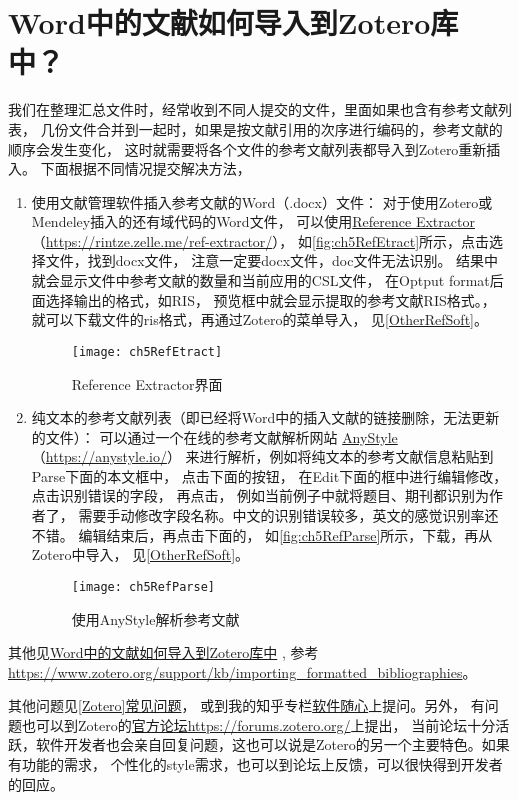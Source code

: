 \documentclass[cn,11pt,chinese]{elegantbook}
\begin{document}
	\section{Word中的文献如何导入到Zotero库中？}\label{sec:RefExtract}	
			我们在整理汇总文件时，经常收到不同人提交的文件，里面如果也含有参考文献列表，
			几份文件合并到一起时，如果是按文献引用的次序进行编码的，参考文献的顺序会发生变化，
			这时就需要将各个文件的参考文献列表都导入到Zotero重新插入。
			下面根据不同情况提交解决方法，
			\begin{enumerate}
				\item 使用文献管理软件插入参考文献的Word（.docx）文件：
				对于使用Zotero或Mendeley插入的还有域代码的Word文件，
				可以使用\href{https://rintze.zelle.me/ref-extractor/}
				{Reference Extractor}（\url{https://rintze.zelle.me/ref-extractor/}），
				如\autoref{fig:ch5RefEtract}所示，点击选择文件，找到docx文件，
				注意一定要docx文件，doc文件无法识别。
				结果中就会显示文件中参考文献的数量和当前应用的CSL文件，
				在Optput format后面选择输出的格式，如RIS，
				预览框中就会显示提取的参考文献RIS格式。，
				就可以下载文件的ris格式，再通过Zotero的菜单导入，
				见\cref{OtherRefSoft}。
				\begin{figure}[htbp]
					\centering
					\texttt{[image: ch5RefEtract]}
					\caption{Reference Extractor界面}
					\label{fig:ch5RefEtract}
				\end{figure}
		\item 纯文本的参考文献列表（即已经将Word中的插入文献的链接删除，无法更新的文件）：		
			可以通过一个在线的参考文献解析网站
			\href{https://anystyle.io/}{AnyStyle}（\url{https://anystyle.io/}）
			来进行解析，例如将纯文本的参考文献信息粘贴到Parse下面的本文框中，
			点击下面的按钮，
			在Edit下面的框中进行编辑修改，点击识别错误的字段，
			再点击，
			例如当前例子中就将题目、期刊都识别为作者了，
			需要手动修改字段名称。中文的识别错误较多，英文的感觉识别率还不错。
			编辑结束后，再点击下面的，
			如\autoref{fig:ch5RefParse}所示，下载，再从Zotero中导入，
			见\cref{OtherRefSoft}。
			\begin{figure}[t]
				\centering
				\texttt{[image: ch5RefParse]}
				\caption{使用AnyStyle解析参考文献}
				\label{fig:ch5RefParse}
			\end{figure}
			\end{enumerate}
			
			其他见\href{https://zhuanlan.zhihu.com/p/309597293}
			{Word中的文献如何导入到Zotero库中}
			,			
			参考
			\url{https://www.zotero.org/support/kb/importing_formatted_bibliographies}。


		其他问题见\href{https://zhuanlan.zhihu.com/p/57379260}{[Zotero]常见问题}，
		或到我的知乎专栏\href{https://zhuanlan.zhihu.com/c_1071081428967743488}{软件随心}上提问。另外，
		有问题也可以到Zotero的\href{https://forums.zotero.org/}{官方论坛https://forums.zotero.org/}上提出，
		当前论坛十分活跃，软件开发者也会亲自回复问题，这也可以说是Zotero的另一个主要特色。如果有功能的需求，
		个性化的style需求，也可以到论坛上反馈，可以很快得到开发者的回应。
		
\end{document}
